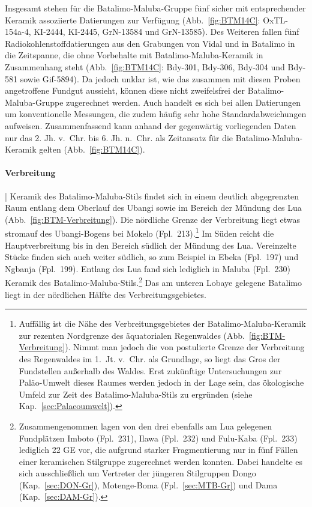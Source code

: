 Insgesamt stehen für die Batalimo-Maluba-Gruppe fünf sicher mit entsprechender Keramik assoziierte Datierungen zur Verfügung (Abb.~\ref{fig:BTM14C}: OxTL-154a-4, KI-2444, KI-2445, GrN-13584 und GrN-13585). Des Weiteren fallen fünf Radiokohlenstoffdatierungen aus den Grabungen von Vidal und \textcite{Kote.1992} in Batalimo in die Zeitspanne, die ohne Vorbehalte mit Batalimo-Maluba-Keramik in Zusammenhang steht (Abb.~\ref{fig:BTM14C}: Bdy-301, Bdy-306, Bdy-304 und Bdy-581 sowie Gif-5894). Da jedoch unklar ist, wie das zusammen mit diesen Proben angetroffene Fundgut aussieht, können diese nicht zweifelsfrei der Batalimo-Maluba-Gruppe zugerechnet werden. Auch handelt es sich bei allen Datierungen um konventionelle Messungen, die zudem häufig sehr hohe Standardabweichungen aufweisen. Zusammenfassend kann anhand der gegenwärtig vorliegenden Daten nur das 2. Jh. v.~Chr. bis 6. Jh. n.~Chr. als Zeitansatz für die Batalimo-Maluba-Keramik gelten (Abb.~\ref{fig:BTM14C}).

\paragraph{Verbreitung}\hspace{-.5em}|\hspace{.5em}%
Keramik  des Batalimo-Maluba-Stils findet sich in einem deutlich abgegrenzten Raum entlang dem Oberlauf des \mbox{Ubangi} sowie im Bereich der Mündung des Lua (Abb.~\ref{fig:BTM-Verbreitung}). Die nördliche Grenze der Verbreitung liegt etwas stromauf des \mbox{Ubangi}-Bogens bei Mokelo (Fpl.~213).\footnote{Auffällig ist die Nähe des Verbreitungsgebietes der Batalimo-Maluba-Keramik zur rezenten Nordgrenze des äquatorialen Regenwaldes (Abb.~\ref{fig:BTM-Verbreitung}). Nimmt man jedoch die von \textcite[7 Abb.~4]{Maley.2001} postulierte Grenze der Verbreitung des Regenwaldes im 1.~Jt. v.~Chr. als Grundlage, so liegt das Gros der Fundstellen außerhalb des Waldes. Erst zukünftige Untersuchungen zur Paläo-Umwelt dieses Raumes werden jedoch in der Lage sein, das ökologische Umfeld zur Zeit des Batalimo-Maluba-Stils zu ergründen (siehe Kap.~\ref{sec:Palaeoumwelt}).} Im Süden reicht die Hauptverbreitung bis in den Bereich südlich der Mündung des Lua. Vereinzelte Stücke finden sich auch weiter südlich, so zum Beispiel in Ebeka (Fpl.~197) und \mbox{Ngbanja} (Fpl.~199). Entlang des Lua fand sich lediglich in Maluba (Fpl.~230) Keramik des Batalimo-Maluba-Stils.\footnote{Zusammengenommen lagen von den drei ebenfalls am Lua gelegenen Fundplätzen Imboto (Fpl.~231), Ilawa (Fpl.~232) und Fulu-Kaba (Fpl.~233) lediglich 22 GE vor, die aufgrund starker Fragmentierung nur in fünf Fällen einer keramischen Stilgruppe zugerechnet werden konnten. Dabei handelte es sich ausschließlich um Vertreter der jüngeren Stilgruppen Dongo (Kap.~\ref{sec:DON-Gr}), Motenge-Boma (Fpl.~\ref{sec:MTB-Gr}) und Dama (Kap.~\ref{sec:DAM-Gr}).} Das am unteren Lobaye gelegene Batalimo \parencite{deBayledesHermens.1975} liegt in der nördlichen Hälfte des Verbreitungsgebietes.

